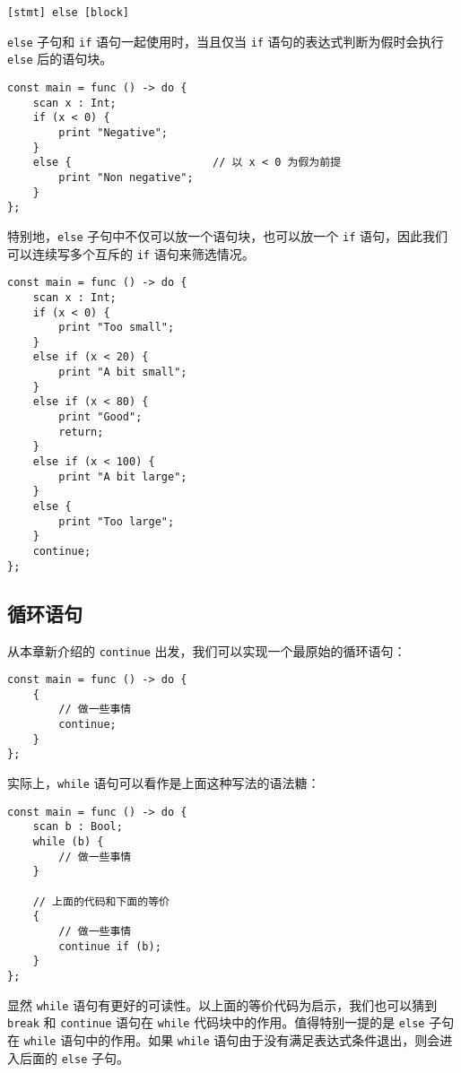 \begin{grammar}
    \lstinline![stmt] else [block]!
\end{grammar}

\lstinline!else! 子句和 \lstinline!if! 语句一起使用时，当且仅当 \lstinline!if! 语句的表达式判断为假时会执行 \lstinline!else! 后的语句块。

\begin{lstlisting}
const main = func () -> do {
    scan x : Int;
    if (x < 0) {
        print "Negative";
    }
    else {                      // 以 x < 0 为假为前提
        print "Non negative";
    }
};
\end{lstlisting}

特别地，\lstinline!else! 子句中不仅可以放一个语句块，也可以放一个 \lstinline!if! 语句，因此我们可以连续写多个互斥的 \lstinline!if! 语句来筛选情况。

\begin{lstlisting}
const main = func () -> do {
    scan x : Int;
    if (x < 0) {
        print "Too small";
    }
    else if (x < 20) {
        print "A bit small";
    }
    else if (x < 80) {
        print "Good";
        return;
    }
    else if (x < 100) {
        print "A bit large";
    }
    else {
        print "Too large";
    }
    continue;
};
\end{lstlisting}

\subsection{循环语句}

从本章新介绍的 \lstinline!continue! 出发，我们可以实现一个最原始的循环语句：

\begin{lstlisting}
const main = func () -> do {
    {
        // 做一些事情
        continue;
    }
};
\end{lstlisting}

实际上，\lstinline!while! 语句可以看作是上面这种写法的语法糖：

\begin{lstlisting}
const main = func () -> do {
    scan b : Bool;
    while (b) {
        // 做一些事情
    }

    // 上面的代码和下面的等价
    {
        // 做一些事情
        continue if (b);
    }
};
\end{lstlisting}

显然 \lstinline!while! 语句有更好的可读性。以上面的等价代码为启示，我们也可以猜到 \lstinline!break! 和 \lstinline!continue! 语句在 \lstinline!while! 代码块中的作用。值得特别一提的是 \lstinline!else! 子句在 \lstinline!while! 语句中的作用。如果 \lstinline!while! 语句由于没有满足表达式条件退出，则会进入后面的 \lstinline!else! 子句。

